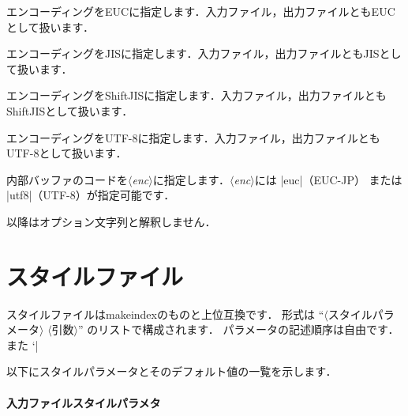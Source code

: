 \documentclass[a4paper]{jsarticle}
\newcommand{\SoftName}[1]{\textsf{#1}}
\newcommand{\Meta}[1]{$\langle$\mbox{}\textit{#1}\mbox{}$\rangle$}
\newcommand{\jMeta}[1]{$\langle$\mbox{}\textsf{#1}\mbox{}$\rangle$}
\begin{document}
\begin{description}[leftmargin=2cm]
\item[|-E|]
エンコーディングをEUCに指定します．入力ファイル，出力ファイルともEUCとして扱います．

\item[|-J|]
エンコーディングをJISに指定します．入力ファイル，出力ファイルともJISとして扱います．

\item[|-S|]
エンコーディングをShiftJISに指定します．入力ファイル，出力ファイルともShiftJISとして扱います．

\item[|-U|]
エンコーディングをUTF-8に指定します．入力ファイル，出力ファイルともUTF-8として扱います．

\item[|-I| \Meta{enc}]
内部バッファのコードを\Meta{enc}に指定します．\Meta{enc}には |euc|（EUC-JP）
または |utf8|（UTF-8）が指定可能です．

\item[|--|]
以降はオプション文字列と解釈しません． %
\end{description}

\section{スタイルファイル}

スタイルファイルは\SoftName{makeindex}のものと上位互換です．
形式は ``\jMeta{スタイルパラメータ} \jMeta{引数}'' のリストで構成されます．
パラメータの記述順序は自由です．また `|%

以下にスタイルパラメータとそのデフォルト値の一覧を示します．

\paragraph{入力ファイルスタイルパラメタ}
\end{document}
